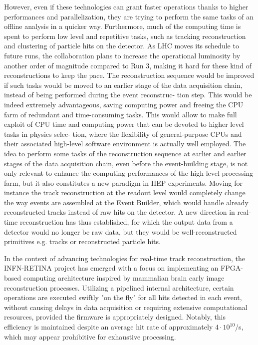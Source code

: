 However, even if these technologies can grant faster operations thanks to higher performances and parallelization, they are trying to perform the same tasks of an offline analysis in a quicker way. Furthermore, much of the computing time is spent to perform low level and repetitive tasks, such as tracking reconstruction and clustering of particle hits on the detector. As LHC moves its schedule to future runs, the collaboration plans to increase the operational luminosity by another order of magnitude compared to Run 3, making it hard for these kind of reconstructions to keep the pace. The reconstruction sequence would be improved if such tasks would be moved to an earlier stage of the data acquisition chain, instead of being performed during the event reconstruc- tion step. This would be indeed extremely advantageous, saving computing power and freeing the CPU farm of redundant and time-consuming tasks. This would allow to make full exploit of CPU time and computing power that can be devoted to higher level tasks in physics selec- tion, where the flexibility of general-purpose CPUs and their associated high-level software environment is actually well employed.
The idea to perform some tasks of the reconstruction sequence at earlier and earlier stages of the data acquisition chain, even before the event-building stage, is not only relevant to enhance the computing performances of the high-level processing farm, but it also constitutes a new paradigm in HEP experiments. Moving for instance the track reconstruction at the readout level would completely change the way events are assembled at the Event Builder, which would handle already reconstructed tracks instead of raw hits on the detector. A new direction in real-time reconstruction has thus established, for which the output data from a detector would no longer be raw data, but they would be well-reconstructed primitives e.g. tracks or reconstructed particle hits.

In the context of advancing technologies for real-time track reconstruction, the INFN-RETINA project has emerged with a focus on implementing an FPGA-based computing architecture inspired by  mammalian brain early image reconstruction processes. Utilizing a pipelined internal architecture, certain operations are executed swiftly "on the fly" for all hits detected in each event, without causing delays in data acquisition or requiring extensive computational resources, provided the firmware is appropriately designed. Notably, this efficiency is maintained despite an average hit rate of approximately $4 \cdot 10^{10}$/s, which may appear prohibitive for exhaustive processing.

